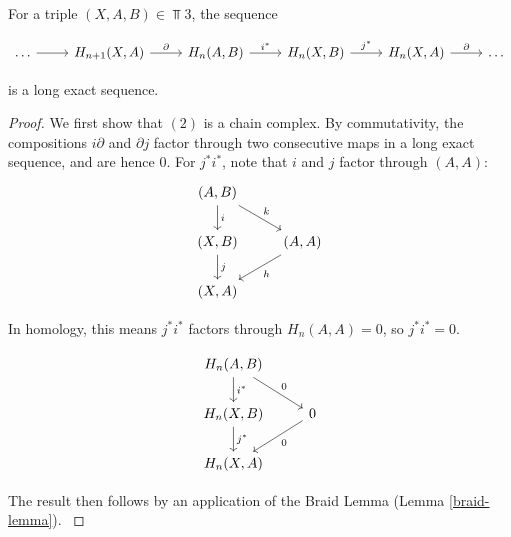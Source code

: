 \begin{prop}
For a triple $(X,A,B)\in \Top{3}$, the sequence

\[\begin{tikzcd}
\dots \arrow[r] & {H_{n+1}(X,A)} \arrow[r, "\partial"] & {H_n(A,B)} \arrow[r, "i^*"] & {H_n(X,B)} \arrow[r, "j^*"] & {H_n(X,A)} \arrow[r, "\partial"] & \dots
\end{tikzcd}\]


is a long exact sequence.
\end{prop}
\begin{proof}
We first show that $(2)$ is a chain complex. By commutativity, the compositions $i\partial$ and $\partial j$ factor through two consecutive maps in a long exact sequence, and are hence $0$. For $j^*i^*$, note that $i$ and $j$ factor through $(A,A)$:
\[\begin{tikzcd}
{(A,B)} \arrow[d, "i"] \arrow[rd, "k"] &                         \\
{(X,B)} \arrow[d, "j"]                 & {(A,A)} \arrow[ld, "h"] \\
{(X,A)}                                &                        
\end{tikzcd}\]

In homology, this means $j^*i^*$ factors through $H_n(A,A)=0$, so $j^*i^*=0$.

\[\begin{tikzcd}
{H_n(A,B)} \arrow[d, "i^*"] \arrow[rd, "0"] &                   \\
{H_n(X,B)} \arrow[d, "j^*"]                 & 0 \arrow[ld, "0"] \\
{H_n(X,A)}                                  &                  
\end{tikzcd}\]

The result then follows by an application of the Braid Lemma (Lemma \ref{braid-lemma}).
\cite{Werndli}
\end{proof}

